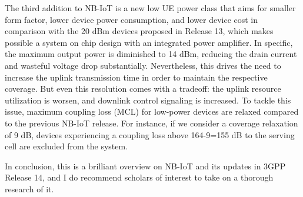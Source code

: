 \documentclass[12pt, a4paper, onside]{article}
\begin{document}
The third addition to NB-IoT is a new low UE power class that aims for smaller form factor, lower device power consumption, and lower device cost in comparison with the 20 dBm devices proposed in Release 13, which makes possible a system on chip design with an integrated power amplifier. In specific, the maximum output power is diminished to 14 dBm, reducing the drain current and wasteful voltage drop substantially. Nevertheless, this drives the need to increase the uplink transmission time in order to maintain the respective coverage. But even this resolution comes with a tradeoff: the uplink resource utilization is worsen, and downlink control signaling is increased. To tackle this issue, maximum coupling loss (MCL) for low-power devices are relaxed compared to the previous NB-IoT release. For instance, if we consider a coverage relaxation of 9 dB, devices experiencing a coupling loss above 164-9=155 dB to the serving cell are excluded from the system.

In conclusion, this is a brilliant overview on NB-IoT and its updates in 3GPP Release 14, and I do recommend scholars of interest to take on a thorough research of it.

\printbibliography
\end{document}
